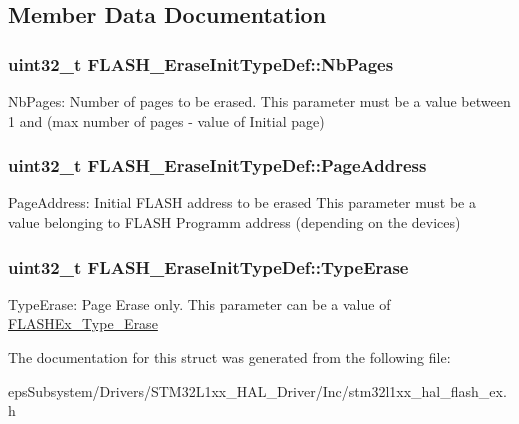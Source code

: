 \subsection{Member Data Documentation}
\hypertarget{struct_f_l_a_s_h___erase_init_type_def_ad18bd4b3caaccd0d51a4faf3c6b3b57f}{
\subsubsection[{Nb\-Pages}]{\setlength{\rightskip}{0pt plus 5cm}uint32\-\_\-t F\-L\-A\-S\-H\-\_\-\-Erase\-Init\-Type\-Def\-::\-Nb\-Pages}}\label{struct_f_l_a_s_h___erase_init_type_def_ad18bd4b3caaccd0d51a4faf3c6b3b57f}
Nb\-Pages\-: Number of pages to be erased. This parameter must be a value between 1 and (max number of pages -\/ value of Initial page) \hypertarget{struct_f_l_a_s_h___erase_init_type_def_ab078898fc3e86294ce8335f6c03387b1}{
\subsubsection[{Page\-Address}]{\setlength{\rightskip}{0pt plus 5cm}uint32\-\_\-t F\-L\-A\-S\-H\-\_\-\-Erase\-Init\-Type\-Def\-::\-Page\-Address}}\label{struct_f_l_a_s_h___erase_init_type_def_ab078898fc3e86294ce8335f6c03387b1}
Page\-Address\-: Initial F\-L\-A\-S\-H address to be erased This parameter must be a value belonging to F\-L\-A\-S\-H Programm address (depending on the devices) \hypertarget{struct_f_l_a_s_h___erase_init_type_def_a5d08471046a663db76d2252848a7d66c}{
\subsubsection[{Type\-Erase}]{\setlength{\rightskip}{0pt plus 5cm}uint32\-\_\-t F\-L\-A\-S\-H\-\_\-\-Erase\-Init\-Type\-Def\-::\-Type\-Erase}}\label{struct_f_l_a_s_h___erase_init_type_def_a5d08471046a663db76d2252848a7d66c}
Type\-Erase\-: Page Erase only. This parameter can be a value of \hyperlink{group___f_l_a_s_h_ex___type___erase}{F\-L\-A\-S\-H\-Ex\-\_\-\-Type\-\_\-\-Erase} 

The documentation for this struct was generated from the following file\-:\begin{DoxyCompactItemize}
\item 
eps\-Subsystem/\-Drivers/\-S\-T\-M32\-L1xx\-\_\-\-H\-A\-L\-\_\-\-Driver/\-Inc/stm32l1xx\-\_\-hal\-\_\-flash\-\_\-ex.\-h\end{DoxyCompactItemize}
